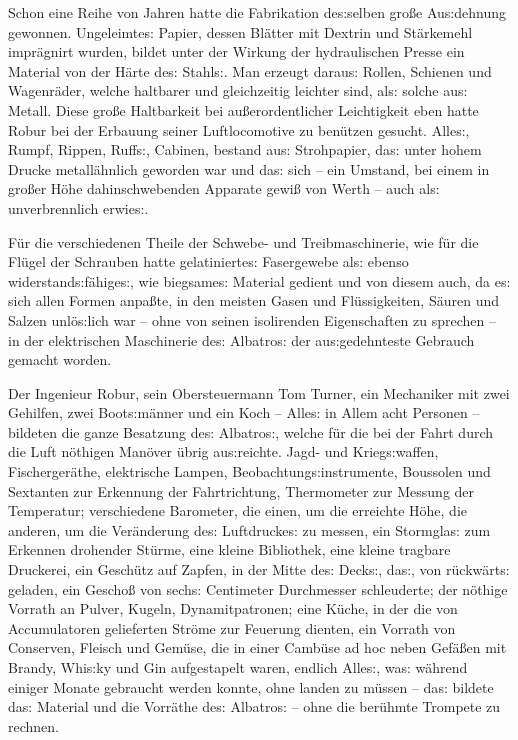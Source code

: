 \documentclass[oneside,12pt]{book}
\newenvironment{antiqua}{\normalfont}{}
\newcommand{\s}{s:}
\begin{document}
Schon eine Reihe von Jahren hatte die Fabrikation de{\s}selben
gro{\ss}e Au{\s}dehnung gewonnen. Ungeleimte{\s} Papier, dessen
Bl\"atter mit Dextrin und St\"arkemehl impr\"agnirt wurden, bildet
unter der Wirkung der hydraulischen Presse ein Material von der
H\"arte de{\s} Stahl{\s}. Man erzeugt darau{\s} Rollen, Schienen und
Wagenr\"ader, welche haltbarer und gleichzeitig leichter sind, al{\s}
solche au{\s} Metall. Diese gro{\ss}e Haltbarkeit bei
au{\ss}erordentlicher Leichtigkeit eben hatte Robur bei der Erbauung
seiner Luftlocomotive zu ben\"utzen gesucht. Alle{\s}, Rumpf, Rippen,
Ruff{\s}, Cabinen, bestand au{\s} Strohpapier, da{\s} unter hohem
Drucke metall\"ahnlich geworden war und da{\s} sich -- ein Umstand,
bei einem in gro{\ss}er H\"ohe dahinschwebenden Apparate gewi{\ss}
von Werth -- auch al{\s} unverbrennlich erwie{\s}.

F\"ur die verschiedenen Theile der Schwebe- und Treibmaschinerie, wie
f\"ur die Fl\"ugel der Schrauben hatte gelatinierte{\s} Fasergewebe
al{\s} ebenso widerstand{\s}f\"ahige{\s}, wie biegsame{\s} Material
gedient und von diesem auch, da e{\s} sich allen Formen anpa{\ss}te,
in den meisten Gasen und Fl\"ussigkeiten, S\"auren und Salzen
unl\"o{\s}lich war -- ohne von seinen isolirenden Eigenschaften zu
sprechen -- in der elektrischen Maschinerie de{\s}
{\glqq}Albatro{\s}{\grqq} der au{\s}gedehnteste Gebrauch gemacht
worden.

Der Ingenieur Robur, sein Obersteuermann Tom Turner, ein Mechaniker
mit zwei Gehilfen, zwei Boot{\s}m\"anner und ein Koch -- Alle{\s} in
Allem acht Personen -- bildeten die ganze Besatzung de{\s}
{\glqq}Albatro{\s}{\grqq}, welche f\"ur die bei der Fahrt durch die
Luft n\"othigen Man\"over \"ubrig au{\s}reichte. Jagd- und
Krieg{\s}waffen, Fischerger\"athe, elektrische Lampen,
Beobachtung{\s}instrumente, Boussolen und Sextanten zur Erkennung der
Fahrtrichtung, Thermometer zur Messung der Temperatur; verschiedene
Barometer, die einen, um die erreichte H\"ohe, die anderen, um die
Ver\"anderung de{\s} Luftdrucke{\s} zu messen, ein
{\glqq}Stormgla{\s}{\grqq} zum Erkennen drohender St\"urme, eine
kleine Bibliothek, eine kleine tragbare Druckerei, ein Gesch\"utz auf
Zapfen, in der Mitte de{\s} Deck{\s}, da{\s}, von r\"uckw\"art{\s}
geladen, ein Gescho{\ss} von sech{\s} Centimeter Durchmesser
schleuderte; der n\"othige Vorrath an Pulver, Kugeln,
Dynamitpatronen; eine K\"uche, in der die von Accumulatoren
gelieferten Str\"ome zur Feuerung dienten, ein Vorrath von Conserven,
Fleisch und Gem\"use, die in einer Camb\"use \begin{antiqua}ad
hoc\end{antiqua} neben Gef\"a{\ss}en mit Brandy, Whi{\s}ky und Gin
aufgestapelt waren, endlich Alle{\s}, wa{\s} w\"ahrend einiger Monate
gebraucht werden konnte, ohne landen zu m\"ussen -- da{\s} bildete
da{\s} Material und die Vorr\"athe de{\s} {\glqq}Albatro{\s}{\grqq}
-- ohne die ber\"uhmte Trompete zu rechnen.
\end{document}
